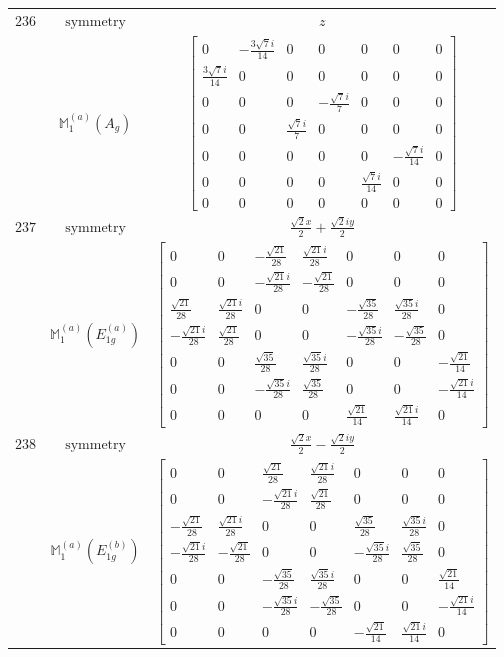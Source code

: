 \documentclass[fleqn,8pt,landscape]{jsarticle}
\begin{document}
\begin{longtable}{ccc}
$ 236 $ & $ \text{symmetry} $ & $ z $ \\
$  $ & $ \mathbb{M}_{1}^{(a)}(A_{g}) $ & $ \begin{bmatrix} 0 & - \frac{3 \sqrt{7} i}{14} & 0 & 0 & 0 & 0 & 0 \\ \frac{3 \sqrt{7} i}{14} & 0 & 0 & 0 & 0 & 0 & 0 \\ 0 & 0 & 0 & - \frac{\sqrt{7} i}{7} & 0 & 0 & 0 \\ 0 & 0 & \frac{\sqrt{7} i}{7} & 0 & 0 & 0 & 0 \\ 0 & 0 & 0 & 0 & 0 & - \frac{\sqrt{7} i}{14} & 0 \\ 0 & 0 & 0 & 0 & \frac{\sqrt{7} i}{14} & 0 & 0 \\ 0 & 0 & 0 & 0 & 0 & 0 & 0 \end{bmatrix} $ \\ \hline
$ 237 $ & $ \text{symmetry} $ & $ \frac{\sqrt{2} x}{2} + \frac{\sqrt{2} i y}{2} $ \\
$  $ & $ \mathbb{M}_{1}^{(a)}(E_{1g}^{(a)}) $ & $ \begin{bmatrix} 0 & 0 & - \frac{\sqrt{21}}{28} & \frac{\sqrt{21} i}{28} & 0 & 0 & 0 \\ 0 & 0 & - \frac{\sqrt{21} i}{28} & - \frac{\sqrt{21}}{28} & 0 & 0 & 0 \\ \frac{\sqrt{21}}{28} & \frac{\sqrt{21} i}{28} & 0 & 0 & - \frac{\sqrt{35}}{28} & \frac{\sqrt{35} i}{28} & 0 \\ - \frac{\sqrt{21} i}{28} & \frac{\sqrt{21}}{28} & 0 & 0 & - \frac{\sqrt{35} i}{28} & - \frac{\sqrt{35}}{28} & 0 \\ 0 & 0 & \frac{\sqrt{35}}{28} & \frac{\sqrt{35} i}{28} & 0 & 0 & - \frac{\sqrt{21}}{14} \\ 0 & 0 & - \frac{\sqrt{35} i}{28} & \frac{\sqrt{35}}{28} & 0 & 0 & - \frac{\sqrt{21} i}{14} \\ 0 & 0 & 0 & 0 & \frac{\sqrt{21}}{14} & \frac{\sqrt{21} i}{14} & 0 \end{bmatrix} $ \\ \hline
$ 238 $ & $ \text{symmetry} $ & $ \frac{\sqrt{2} x}{2} - \frac{\sqrt{2} i y}{2} $ \\
$  $ & $ \mathbb{M}_{1}^{(a)}(E_{1g}^{(b)}) $ & $ \begin{bmatrix} 0 & 0 & \frac{\sqrt{21}}{28} & \frac{\sqrt{21} i}{28} & 0 & 0 & 0 \\ 0 & 0 & - \frac{\sqrt{21} i}{28} & \frac{\sqrt{21}}{28} & 0 & 0 & 0 \\ - \frac{\sqrt{21}}{28} & \frac{\sqrt{21} i}{28} & 0 & 0 & \frac{\sqrt{35}}{28} & \frac{\sqrt{35} i}{28} & 0 \\ - \frac{\sqrt{21} i}{28} & - \frac{\sqrt{21}}{28} & 0 & 0 & - \frac{\sqrt{35} i}{28} & \frac{\sqrt{35}}{28} & 0 \\ 0 & 0 & - \frac{\sqrt{35}}{28} & \frac{\sqrt{35} i}{28} & 0 & 0 & \frac{\sqrt{21}}{14} \\ 0 & 0 & - \frac{\sqrt{35} i}{28} & - \frac{\sqrt{35}}{28} & 0 & 0 & - \frac{\sqrt{21} i}{14} \\ 0 & 0 & 0 & 0 & - \frac{\sqrt{21}}{14} & \frac{\sqrt{21} i}{14} & 0 \end{bmatrix} $ \\ \hline

\end{longtable}
\end{document}
